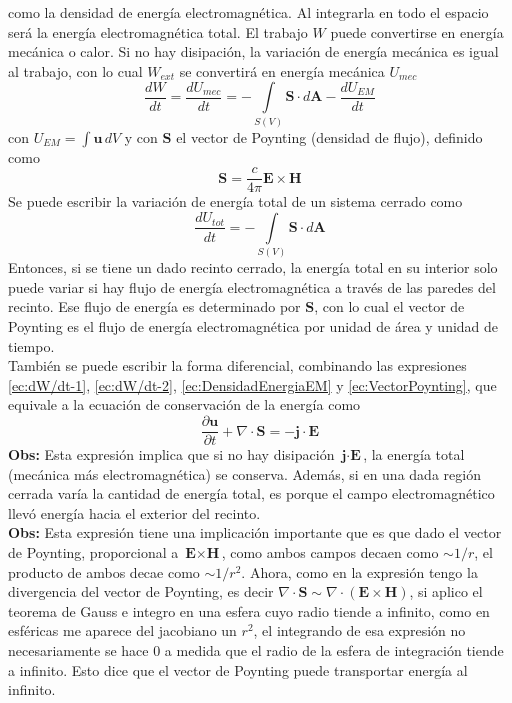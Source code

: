 como la densidad de energía electromagnética. Al integrarla en todo el espacio será la energía electromagnética total. El trabajo $W$ puede convertirse en energía mecánica o calor. Si no hay disipación, la variación de energía mecánica es igual al trabajo, con lo cual $W_{ext}$ se convertirá en energía mecánica $U_{mec}$ 
\begin{equation*}
    \frac{dW}{dt} = \frac{dU_{mec}}{dt} = - \int\limits_{S(V)}
    \textbf{S}\cdot d\textbf{A} - \frac{dU_{EM}}{dt}
\end{equation*}
con $U_{EM} = \int \textbf{u}\,dV$ y con $\textbf{S}$ el vector de Poynting (densidad de flujo), definido como
\begin{equation}
    \textbf{S} = \frac{c}{4\pi}\textbf{E}\times \textbf{H}
        \label{ec:VectorPoynting}
\end{equation}
Se puede escribir la variación de energía total de un sistema cerrado como
\begin{equation*}
    \frac{dU_{tot}}{dt} = 
    - \int\limits_{S(V)}\textbf{S}\cdot d\textbf{A}
\end{equation*}
Entonces, si se tiene un dado recinto cerrado, la energía total en su interior solo puede variar si hay flujo de energía electromagnética a través de las paredes del recinto. Ese flujo de energía es determinado por $\textbf{S}$, con lo cual el vector de Poynting es el flujo de energía electromagnética por unidad de área y unidad de tiempo.\\
\indent También se puede escribir la forma diferencial, combinando las expresiones \eqref{ec:dW/dt-1}, \eqref{ec:dW/dt-2}, \eqref{ec:DensidadEnergiaEM} y \eqref{ec:VectorPoynting}, que equivale a la ecuación de conservación de la energía como
\begin{equation*}
    \frac{\partial \textbf{u}}{\partial t} + \nabla \cdot \textbf{S} = -\textbf{j}\cdot \textbf{E}
\end{equation*}
\textbf{Obs:} Esta expresión implica que si no hay disipación $\textbf{j}\cdot \textbf{E}$, la energía total (mecánica más electromagnética) se conserva. Además, si en una dada región cerrada varía la cantidad de energía total, es porque el campo electromagnético llevó energía hacia el exterior del recinto.\\
\textbf{Obs:} Esta expresión tiene una implicación importante que es que dado el vector de Poynting, proporcional a $\textbf{E}\times \textbf{H}$, como ambos campos decaen como $\sim 1/r$, el producto de ambos decae como $\sim 1/r^{2}$. Ahora, como en la expresión tengo la divergencia del vector de Poynting, es decir $\nabla \cdot \textbf{S} \sim \nabla \cdot (\textbf{E}\times \textbf{H})$, si aplico el teorema de Gauss e integro en una esfera cuyo radio tiende a infinito, como en esféricas me aparece del jacobiano un $r^{2}$, el integrando de esa expresión no necesariamente se hace $0$ a medida que el radio de la esfera de integración tiende a infinito. Esto dice que el vector de Poynting puede transportar energía al infinito.

